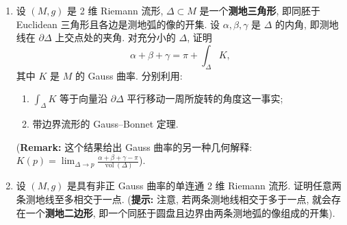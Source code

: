 \begin{RiemannExercise}
\begin{enumerate}[label=(\arabic*),ref=\arabic*,leftmargin=*]
\begin{enumerate}[label=(\alph*),leftmargin=*]
\[
  (Hf)_p(v,w)=\left.\frac{\partial^2}{\partial t\,\partial s}\right|_{s=t=0}(f\circ\gamma)(s,t),
\]
给出的映射 $(Hf)_p:T_pM\times T_pM\to\mathbb{R}$, 其中 $\gamma:U\subset\mathbb{R}^2\to M$ 满足 $\gamma(0,0)=p$, $\frac{\partial\gamma}{\partial s}(0,0)=v$ 和 $\frac{\partial\gamma}{\partial t}(0,0)=w$. 证明 $(Hf)_p$ 是一个良定义的对称 2-张量.
\item (\emph{Morse 定理}) 若 $(Hf)_p$ 非退化, 则称 $p$ 为\textbf{非退化临界点}. 假设 $M$ 紧且 $f$ 是一个 \textbf{Morse 函数}, 即它的所有临界点都非退化. 证明临界点只有有限个. 进一步证明, 若 $M$ 为 2 维, 则
\[
  \chi(M)=m-s+n,
\]
其中 $m$, $n$ 和 $s$ 分别为极大值点, 极小值点和鞍点的数目.
{\small (\textbf{提示:} 在 $M$ 上选取一个 Riemann 度量, 并考虑向量场 $X:=\operatorname{grad}f$).}
\end{enumerate}
\item\label{ex:gauss-curvature-by-geodesic-triangle} 设 $(M,g)$ 是 2 维 Riemann 流形, $\Delta\subset M$ 是一个\textbf{测地三角形}, 即同胚于 Euclidean 三角形且各边是测地弧的像的开集. 设 $\alpha,\beta,\gamma$ 是 $\Delta$ 的内角, 即测地线在 $\partial\Delta$ 上交点处的夹角. 对充分小的 $\Delta$, 证明
\[
  \alpha+\beta+\gamma=\pi+\int_\Delta K,
\]
其中 $K$ 是 $M$ 的 Gauss 曲率. 分别利用:
\begin{enumerate}[label=(\alph*),leftmargin=*]
\item $\int_\Delta K$ 等于向量沿 $\partial\Delta$ 平行移动一周所旋转的角度这一事实;
\item 带边界流形的 Gauss–Bonnet 定理.
\end{enumerate}
{\small (\textbf{Remark:} 这个结果给出 Gauss 曲率的另一种几何解释: $K(p)=\lim_{\Delta\to p}\frac{\alpha+\beta+\gamma-\pi}{\operatorname{vol}(\Delta)}$).}
\item\label{ex:geodesics-meet-at-most-once-in-nonpositive-gauss-curvature} 设 $(M,g)$ 是具有非正 Gauss 曲率的单连通 2 维 Riemann 流形. 证明任意两条测地线至多相交于一点.
{\small (\textbf{提示:} 注意, 若两条测地线相交于多于一点, 就会存在一个\textbf{测地二边形}, 即一个同胚于圆盘且边界由两条测地弧的像组成的开集).}
\end{enumerate}
\end{RiemannExercise}
